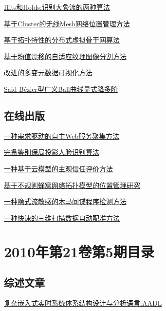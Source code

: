 \documentclass[a4paper]{article}
\begin{document}
\href{http://www.jos.org.cn/ch/reader/download_pdf.aspx?file_no=3522&year_id=2010&quarter_id=6&falg=1}{Hits和Holds:识别大象流的两种算法}

\href{http://www.jos.org.cn/ch/reader/download_pdf.aspx?file_no=3564&year_id=2010&quarter_id=6&falg=1}{基于Cluster的无线Mesh网络位置管理方法}

\href{http://www.jos.org.cn/ch/reader/download_pdf.aspx?file_no=3572&year_id=2010&quarter_id=6&falg=1}{基于拓扑特性的分布式虚拟骨干网算法}

\href{http://www.jos.org.cn/ch/reader/download_pdf.aspx?file_no=3723&year_id=2010&quarter_id=6&falg=1}{基于均值漂移的自适应纹理图像分割方法}

\href{http://www.jos.org.cn/ch/reader/download_pdf.aspx?file_no=3460&year_id=2010&quarter_id=6&falg=1}{改进的多变元数据可视化方法}

\href{http://www.jos.org.cn/ch/reader/download_pdf.aspx?file_no=584&year_id=2010&quarter_id=6&falg=1}{Said-Bézier型广义Ball曲线显式降多阶}

\subsection{在线出版}
\href{http://www.jos.org.cn/ch/reader/download_pdf.aspx?file_no=3666&year_id=2010&quarter_id=6&falg=1}{一种需求驱动的自主Web服务聚集方法}

\href{http://www.jos.org.cn/ch/reader/download_pdf.aspx?file_no=3482&year_id=2010&quarter_id=6&falg=1}{完备鉴别保局投影人脸识别算法}

\href{http://www.jos.org.cn/ch/reader/download_pdf.aspx?file_no=3501&year_id=2010&quarter_id=6&falg=1}{一种基于云模型的主观信任评价方法}

\href{http://www.jos.org.cn/ch/reader/download_pdf.aspx?file_no=3480&year_id=2010&quarter_id=6&falg=1}{基于不规则蜂窝网络拓扑模型的位置管理研究}

\href{http://www.jos.org.cn/ch/reader/download_pdf.aspx?file_no=3507&year_id=2010&quarter_id=6&falg=1}{一种隐式流敏感的木马间谍程序检测方法}

\href{http://www.jos.org.cn/ch/reader/download_pdf.aspx?file_no=3543&year_id=2010&quarter_id=6&falg=1}{一种快速的三维扫描数据自动配准方法}


\section{\textbf{2010年第21卷第5期目录}}
\subsection{综述文章}
\href{http://www.jos.org.cn/ch/reader/download_pdf.aspx?file_no=3700&year_id=2010&quarter_id=5&falg=1}{复杂嵌入式实时系统体系结构设计与分析语言:AADL}
\end{document}
